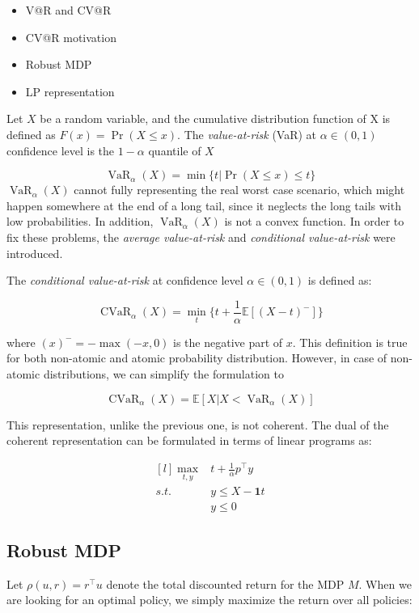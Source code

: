\documentclass{article}
\theoremstyle{remark}
\theoremstyle{remark}
\theoremstyle{remark}
\theoremstyle{remark}
\theoremstyle{remark}
\theoremstyle{remark}
\newcommand{\valatrisk}[2]{\operatorname{VaR}_{#1}(#2)}
\newcommand{\cvalatrisk}[2]{\operatorname{CVaR}_{#1}(#2)}
\begin{document}
\begin{itemize}
  \item V@R and CV@R
  \item CV@R motivation
  \item Robust MDP
  \item LP representation
\end{itemize}

Let $X$ be a random variable, and the cumulative distribution function of X is defined as $F(x) = \Pr (X \leq x)$. The \textit{value-at-risk} (VaR) at $\alpha \in (0,1)$ confidence level is the $1-\alpha$ quantile of $X$

\[
  \valatrisk{\alpha}{X} = \min\{t | \Pr (X \leq x) \leq t\}
\]
$\valatrisk{\alpha}{X}$ cannot fully representing the real worst case scenario, which might happen somewhere at the end of a long tail, since it neglects the long tails with low probabilities. In addition, $\valatrisk{\alpha}{X}$ is not a convex function. In order to fix these problems, the \textit{average value-at-risk} and \textit{conditional value-at-risk} were introduced.


The \textit{conditional value-at-risk} at confidence level $\alpha \in (0,1)$ is defined as:

\[
  \cvalatrisk{\alpha}{X} = \min_t \{ t + \frac{1}{\alpha} \mathbb{E}[(X-t)^-] \}
\]

where $(x)^- = -\max(-x, 0)$ is the negative part of $x$. This definition is true for both non-atomic and atomic probability distribution. However, in case of non-atomic distributions, we can simplify the formulation to

\[
  \cvalatrisk{\alpha}{X} = \mathbb{E}[X | X < \valatrisk{\alpha}{X}]
\]

This representation, unlike the previous one, is not coherent. The dual of the coherent representation can be formulated in terms of linear programs as:

\[
\begin{matrix*}[l]
  \max_{t,y} & t+ \frac{1}{\alpha} p^\top y \\
  s.t. & y \leq X - \mathbf{1}t\\
   & y \leq 0
\end{matrix*}
\]

\subsection*{Robust MDP}

Let $\rho(u, r) = r^\top u$ denote the total discounted return for the MDP $M$. When we are looking for an optimal policy, we simply maximize the return over all policies:
\end{document}
